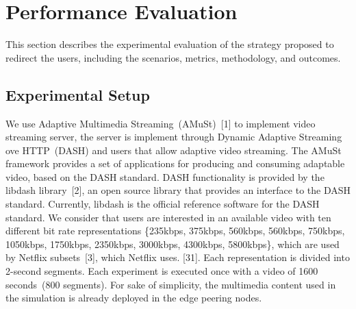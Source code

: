 \section{Performance Evaluation}
\label{sec:results}

This section describes the experimental evaluation of the strategy proposed to redirect the users, including the scenarios, metrics, methodology, and outcomes.
 
%

\subsection{Experimental Setup}


We use Adaptive Multimedia Streaming~(AMuSt)~[1] to implement video streaming server, the server is implement through Dynamic Adaptive Streaming ove HTTP~(DASH) and users that allow adaptive video streaming. The AMuSt framework provides a set of applications for producing and consuming adaptable video, based on the DASH standard. DASH functionality is provided by the libdash library~[2], an open source library that provides an interface to the DASH standard. Currently, libdash is the official reference software for the DASH standard. We consider that users are interested in an available video with ten different bit rate representations \{235kbps, 375kbps, 560kbps, 560kbps, 750kbps, 1050kbps, 1750kbps, 2350kbps, 3000kbps, 4300kbps, 5800kbps\}, which are used by Netflix subsets~[3], which Netflix uses. [31]. Each representation is divided into 2-second segments. Each experiment is executed once with a video of 1600 seconds~(800 segments). 
For sake of simplicity, the multimedia content used in the simulation is already deployed in the edge peering nodes. 

